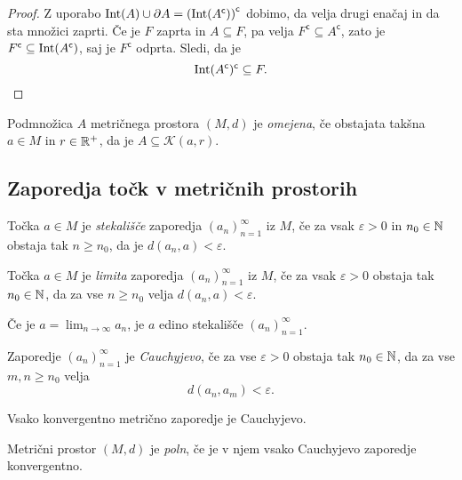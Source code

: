 \documentclass[12pt, a4paper]{article}
\begin{document}
\begin{proof}
Z uporabo $\operatorname{Int}(A)\cup\partial A=\left(\operatorname{Int}(A^\mathsf{c})\right)^\mathsf{c}$ dobimo, da velja drugi enačaj in da sta množici zaprti. Če je $F$ zaprta in $A\subseteq F$, pa velja $F^\mathsf{c}\subseteq A^\mathsf{c}$, zato je $F^\mathsf{c}\subseteq\operatorname{Int}(A^\mathsf{c})$, saj je $F^\mathsf{c}$ odprta. Sledi, da je
\[
\operatorname{Int}(A^\mathsf{c})^\mathsf{c}\subseteq F.\qedhere
\]
\end{proof}

\begin{definicija}
Podmnožica $A$ metričnega prostora $(M,d)$ je \emph{omejena}, če obstajata takšna $a\in M$ in $r\in\mathbb{R}^+$, da je $A\subseteq\mathcal{K}(a,r)$.
\end{definicija}

\newpage

\subsection{Zaporedja točk v metričnih prostorih}

\begin{definicija}
Točka $a\in M$ je \emph{stekališče} zaporedja $(a_n)_{n=1}^\infty$ iz $M$, če za vsak $\varepsilon>0$ in $n_0\in\mathbb{N}$ obstaja tak $n\geq n_0$, da je $d(a_n,a)<\varepsilon$.
\end{definicija}

\begin{definicija}
Točka $a\in M$ je \emph{limita} zaporedja $(a_n)_{n=1}^\infty$ iz $M$, če za vsak $\varepsilon>0$ obstaja tak $n_0\in\mathbb{N}$, da za vse $n\geq n_0$ velja $d(a_n,a)<\varepsilon$.
\end{definicija}

\begin{trditev}
Če je $a=\displaystyle\lim_{n\to\infty}a_n$, je $a$ edino stekališče $(a_n)_{n=1}^\infty$.
\end{trditev}

\obvs

\begin{definicija}
Zaporedje $(a_n)_{n=1}^\infty$ je \emph{Cauchyjevo}, če za vse $\varepsilon>0$ obstaja tak $n_0\in\mathbb{N}$, da za vse $m,n\geq n_0$ velja
\[
d(a_n,a_m)<\varepsilon.
\]
\end{definicija}

\begin{trditev}
Vsako konvergentno metrično zaporedje je Cauchyjevo.
\end{trditev}

\obvs

\begin{definicija}
Metrični prostor $(M,d)$ je \emph{poln}, če je v njem vsako Cauchyjevo zaporedje konvergentno.
\end{definicija}



\newpage
\printindex
\end{document}
